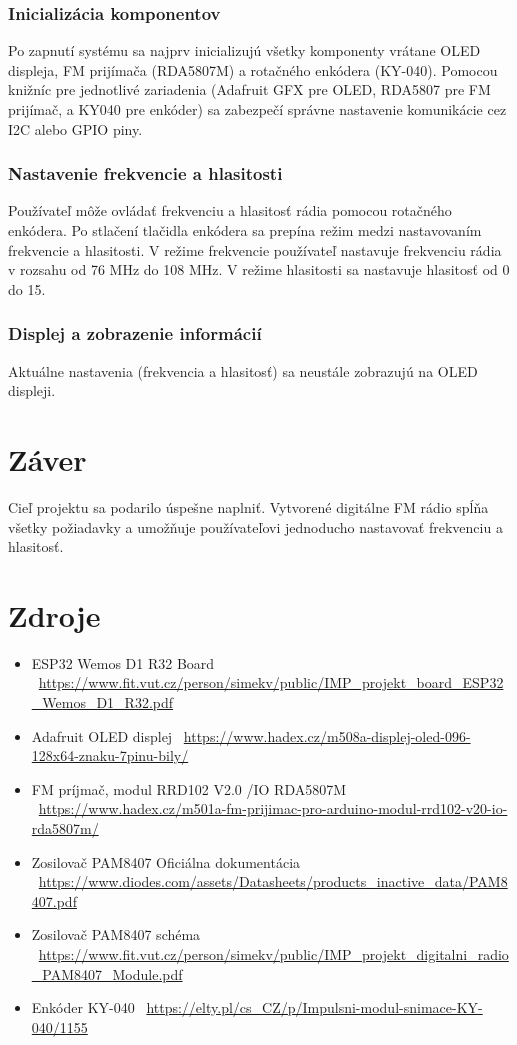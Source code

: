 \documentclass[11pt, a4paper]{article}
\begin{document}
\subsubsection{Inicializácia komponentov} Po zapnutí systému sa najprv inicializujú 
všetky komponenty vrátane OLED displeja, FM prijímača (RDA5807M) a rotačného enkódera 
(KY-040). Pomocou knižníc pre jednotlivé zariadenia (Adafruit GFX pre OLED, RDA5807 pre 
FM prijímač, a KY040 pre enkóder) sa zabezpečí správne nastavenie komunikácie cez I2C 
alebo GPIO piny.

\subsubsection{Nastavenie frekvencie a hlasitosti} 
Používateľ môže ovládať frekvenciu a hlasitosť rádia pomocou rotačného enkódera. 
Po stlačení tlačidla enkódera sa prepína režim medzi nastavovaním frekvencie a 
hlasitosti. V režime frekvencie používateľ nastavuje frekvenciu rádia v rozsahu od 
76 MHz do 108 MHz. V režime hlasitosti sa nastavuje hlasitosť od 0 do 15.

\subsubsection{Displej a zobrazenie informácií} 
Aktuálne nastavenia (frekvencia a hlasitosť) sa neustále zobrazujú na OLED displeji.

\section{Záver}
Cieľ projektu sa podarilo úspešne naplniť. Vytvorené digitálne FM rádio spĺňa všetky 
požiadavky a umožňuje používateľovi jednoducho nastavovať frekvenciu a hlasitosť.

\newpage
\section{Zdroje}
\begin{itemize}
    \item ESP32 Wemos D1 R32 Board \-\ \url{https://www.fit.vut.cz/person/simekv/public/IMP_projekt_board_ESP32_Wemos_D1_R32.pdf}
    \item Adafruit OLED displej \-\ \url{https://www.hadex.cz/m508a-displej-oled-096-128x64-znaku-7pinu-bily/}
    \item FM príjmač, modul RRD102 V2.0 /IO RDA5807M \-\ \url{https://www.hadex.cz/m501a-fm-prijimac-pro-arduino-modul-rrd102-v20-io-rda5807m/}
    \item Zosilovač PAM8407 Oficiálna dokumentácia \-\ \url{https://www.diodes.com/assets/Datasheets/products_inactive_data/PAM8407.pdf}
    \item Zosilovač PAM8407 schéma \-\ \url{https://www.fit.vut.cz/person/simekv/public/IMP_projekt_digitalni_radio_PAM8407_Module.pdf}
    \item Enkóder KY-040 \-\ \url{https://elty.pl/cs_CZ/p/Impulsni-modul-snimace-KY-040/1155}
\end{itemize}
\end{document}
